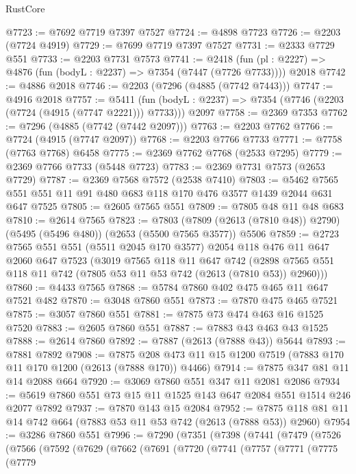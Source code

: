 \begin{lexlean}{RustCore}
\begin{coremodule}
@7723 := @7692 @7719 @7397 @7527
@7724 := @4898 @7723
@7726 := @2203 (@7724 @4919)
@7729 := @7699 @7719 @7397 @7527
@7731 := @2333 @7729 @551
@7733 := @2203 @7731 @7573
@7741 := @2418
    (fun (pl : @2227) => @4876 (fun (bodyL : @2237) => @7354 (@7447 (@7726 @7733))))
    @2018
@7742 := @4886 @2018
@7746 := @2203 (@7296 (@4885 (@7742 @7443)))
@7747 := @4916 @2018
@7757 := @5411
    (fun (bodyL : @2237) => @7354 (@7746 (@2203 (@7724 (@4915 (@7747 @2221))) @7733)))
    @2097
@7758 := @2369 @7353
@7762 := @7296 (@4885 (@7742 (@7442 @2097)))
@7763 := @2203 @7762
@7766 := @7724 (@4915 (@7747 @2097))
@7768 := @2203 @7766 @7733
@7771 := @7758 (@7763 @7768) @6458
@7775 := @2369 @7762 @7768 (@2533 @7295)
@7779 := @2369 @7766 @7733 (@5448 @7723)
@7783 := @2369 @7731 @7573 (@2653 @7729)
@7787 := @2369 @7568 @7572 (@2538 @7410)
@7803 := @5462 @7565 @551 @551 @11 @91 @480 @683 @118 @170 @476 @3577 @1439 @2044 @631 @647 @7525
@7805 := @2605 @7565 @551
@7809 := @7805 @48 @11 @48 @683
@7810 := @2614 @7565
@7823 := @7803
    (@7809 (@2613 (@7810 @48)) @2790)
    (@5495 (@5496 @480))
    (@2653 (@5500 @7565 @3577))
    @5506
@7859 := @2723
    @7565
    @551
    @551
    (@5511 @2045 @170 @3577)
    @2054
    @118
    @476
    @11
    @647
    @2060
    @647
    @7523
    (@3019
      @7565
      @118
      @11
      @647
      @742
      (@2898 @7565 @551 @118 @11 @742 (@7805 @53 @11 @53 @742 (@2613 (@7810 @53)) @2960)))
@7860 := @4433 @7565
@7868 := @5784 @7860 @402 @475 @465 @11 @647 @7521 @482
@7870 := @3048 @7860 @551
@7873 := @7870 @475 @465 @7521
@7875 := @3057 @7860 @551
@7881 := @7875 @73 @474 @463 @16 @1525 @7520
@7883 := @2605 @7860 @551
@7887 := @7883 @43 @463 @43 @1525
@7888 := @2614 @7860
@7892 := @7887 (@2613 (@7888 @43)) @5644
@7893 := @7881 @7892
@7908 := @7875 @208 @473 @11 @15 @1200 @7519 (@7883 @170 @11 @170 @1200 (@2613 (@7888 @170)) @4466)
@7914 := @7875 @347 @81 @11 @14 @2088 @664
@7920 := @3069 @7860 @551 @347 @11 @2081 @2086
@7934 := @5619 @7860 @551 @73 @15 @11 @1525 @143 @647 @2084 @551 @1514 @246 @2077 @7892
@7937 := @7870 @143 @15 @2084
@7952 := @7875 @118 @81 @11 @14 @742 @664 (@7883 @53 @11 @53 @742 (@2613 (@7888 @53)) @2960)
@7954 := @3286 @7860 @551
@7996 := @7290
    (@7351
      (@7398
        (@7441
          (@7479
            (@7526
              (@7566
                (@7592
                  (@7629
                    (@7662
                      (@7691
                        (@7720
                          (@7741
                            (@7757
                              (@7771
                                (@7775
                                  (@7779

\end{coremodule}
\end{lexlean}
